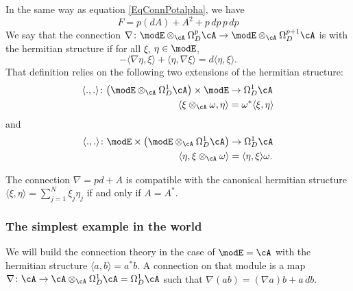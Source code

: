 In the same way as equation \eqref{EqConnPotalpha}, we have
\begin{equation}
	F=p(dA)+A^2+p\,dp\,p\,dp
\end{equation}
We say that the connection $\nabla\colon \modE\otimes_{\cA}\Omega^p_D\cA\to \modE\otimes_{\cA}\Omega^{p+1}_D\cA$ is  with the hermitian structure if for all $\xi$, $\eta\in\modE$,
\begin{equation}
	-\langle \nabla\eta, \xi\rangle +\langle \eta, \nabla\xi\rangle =d\langle \eta, \xi\rangle .
\end{equation}
That definition relies on the following two extensions of the hermitian structure:
\begin{equation}
	\begin{aligned}
		\langle ., .\rangle \colon \big( \modE\otimes_{\cA}\Omega^1_D\cA \big)\times \modE & \to \Omega^1_D\cA                 \\
		\langle \xi\otimes_{\cA}\omega, \eta\rangle                                        & =\omega^*\langle \xi, \eta\rangle
	\end{aligned}
\end{equation}
and
\begin{equation}
	\begin{aligned}
		\langle ., .\rangle \colon \modE\times\big( \modE\otimes_{\cA}\Omega^1_D\cA \big) & \to \Omega^1_D\cA                 \\
		\langle \eta, \xi\otimes_{\cA}\omega\rangle                                       & =\langle \eta, \xi\rangle \omega.
	\end{aligned}
\end{equation}

\begin{proposition}
	The connection $\nabla=pd+A$ is compatible with the canonical hermitian structure $\langle \xi, \eta\rangle =\sum_{j=1}^{N}\xi_j\eta_j$ if and only if $A=A^*$.
\end{proposition}

\subsubsection{The simplest example in the world}	\label{ConnEequalAsime}

We will build the connection theory in the case of $\modE=\cA$ with the hermitian structure $\langle a, b\rangle =a^*b$. A connection on that module is a map $\nabla\colon \cA\to \cA\otimes_{\cA}\Omega^1_D\cA=\Omega^1_D\cA$ such that $\nabla(ab)=(\nabla a)b+a\,db$.

